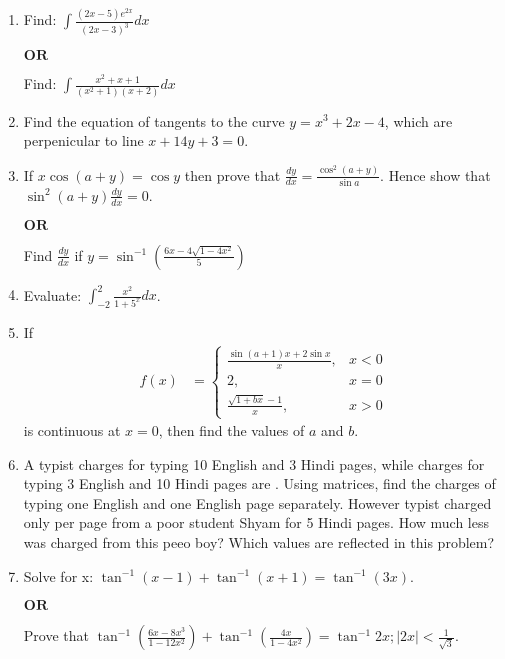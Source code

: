 \documentclass[12pt,-letter paper]{article}
\providecommand{\brak}[1]{\ensuremath{\left(#1\right)}}
\theoremstyle{remark}
\providecommand{\abs}[1]{\left\vert#1\right\vert}
\let\vec\mathbf
\begin{document}
\begin{enumerate}
\item Find: $\int{\frac{(2x - 5)e^{2x}}{(2x-3)^3}dx}$
\begin{center} $\vec{OR}$ \\ \end{center}
Find: $\int{\frac{x^2+x+1}{(x^2+1)(x+2)}dx}$\\

\item Find the equation of tangents to the curve $y=x^3+2x-4$, which are perpenicular to line $x+14y+3=0$.\\

\item If $x\cos(a+y) = \cos{y}$ then prove that $\frac{dy}{dx} = \frac{\cos^2(a+y)}{\sin{a}}$. Hence show that $\sin^2(a+y)\frac{dy}{dx} = 0$.
\begin{center} $\vec{OR}$ \\ \end{center}
Find $\frac{dy}{dx}$ if $y = \sin^{-1}\brak{\frac{6x - 4\sqrt{1-4x^2}}{5}}$\\

\item Evaluate: $\int_{-2}^{2}\frac{x^2}{1+5^x}dx$.\\

\item If \begin{align}f(x) &= \begin{cases}\frac{\sin(a+1)x + 2\sin x}{x}, &x<0\\ 2, &x=0 \\ \frac{\sqrt{1+bx}-1}{x}, &x>0 \end{cases}\end{align} is continuous at $x=0$, then find the values of $a$ and $b$.\\

\item A typist charges  for typing 10 English and 3 Hindi pages, while charges for typing 3 English and 10 Hindi pages are . Using matrices, find the charges of typing one English and one English page separately. However typist charged only  per page from a poor student Shyam for 5 Hindi pages. How much less was charged from this peeo boy? Which values are reflected in this problem?\\

\item Solve for x: $\tan^{-1}(x-1) + \tan^{-1}(x+1) = \tan^{-1}(3x)$.
\begin{center} $\vec{OR}$ \\ \end{center}
Prove that $\tan^{-1}\brak{\frac{6x-8x^3}{1-12x^2}} + \tan^{-1}\brak{\frac{4x}{1-4x^2}} = \tan^{-1}2x; \abs{2x}<\frac{1}{\sqrt{3}}$.\\


\end{enumerate}
\end{document}
